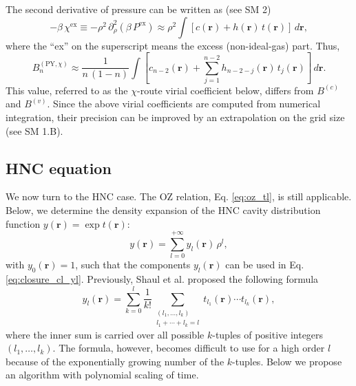 \documentclass[aip,jcp,preprint,superscriptaddress,showpacs,preprintnumbers,amsmath,amssymb]{revtex4-1}
\newcommand{\vct}[1]{\mathbf{#1}}
\providecommand{\vr}{} %
\renewcommand{\vr}{\vct{r}}
\begin{document}
The second derivative of pressure can be written as (see SM 2)
%
\[
-\beta \, \chi^\mathrm{ex}
\equiv
-\rho^2 \, \partial_\rho^2 (\beta \, P^\mathrm{ex})
\approx
\rho^2 \int [c(\vr) + h(\vr) \, t(\vr)] \, d\vr,
\]
where the ``ex'' on the superscript means the excess (non-ideal-gas) part.
%
%
Thus,
%
%
%
\begin{equation}
B_n^{(\mathrm{PY}, \chi)}
\approx
\frac{1}{ n \, (1 - n) }
\int
  \left[
    c_{n-2}(\vr)
    +
    \sum_{j = 1}^{n-2} h_{n-2-j}(\vr) \, t_j(\vr)
  \right]
  \, d\vr.
\label{eq:Bn_ddP}
\end{equation}
%
%
%
This value, referred to as the $\chi$-route virial coefficient below,
differs from $B^{(c)}$ and $B^{(v)}$.
%
Since the above virial coefficients are computed
from numerical integration,
their precision can be improved
by an extrapolation on the grid size (see SM 1.B).





\subsection{\label{sec:HNC}
HNC equation}




We now turn to the HNC case.
%
The OZ relation, Eq. \eqref{eq:oz_tl}, is still applicable.
%
Below,
we determine the density expansion of
the HNC cavity distribution function
$y(\vr) = \exp t(\vr)$:
%
%
%
\begin{equation}
y(\vr)
=
\sum_{l = 0}^{+\infty}
y_l(\vr) \, \rho^l,
\label{eq:yrser}
\end{equation}
%
%
%
with $y_0(\vr) = 1$,
such that the components $y_l(\vr)$
can be used in Eq. \eqref{eq:closure_cl_yl}.
%
Previously,
Shaul et al. proposed the following formula\cite{shaul2011}
%
\[
y_l(\vr)
=
\sum_{k = 0}^l
  \frac{1}{k!}
  \sum_{ \substack{
    (l_1, \dots, l_k) \\
    l_1 + \cdots + l_k = l } }
    t_{l_1}(\vr) \cdots t_{l_k}(\vr),
\]
%
where the inner sum is carried over
all possible $k$-tuples of positive integers
$(l_1, \dots, l_k)$.
%
The formula, however,
becomes difficult to use for a high order $l$
because of the exponentially growing number of the $k$-tuples.
%
Below we propose an algorithm with polynomial scaling of time.
\end{document}
